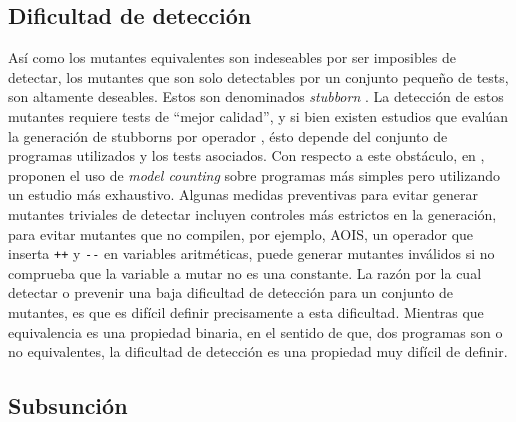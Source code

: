 \subsection{Dificultad de detecci\'on}

As\'i como los mutantes equivalentes son indeseables por ser imposibles de detectar, los mutantes que son solo detectables por un conjunto peque\~no de tests, son altamente deseables. Estos son denominados \emph{stubborn} \cite{bibliography.mutation.evaluation.stubbornHieronsHD99}. La detecci\'on de estos mutantes requiere tests de ``mejor calidad'', y si bien existen estudios que eval\'uan la generaci\'on de stubborns por operador \cite{bibliography.mutation.evaluation.stubborn}, \'esto depende del conjunto de programas utilizados y los tests asociados. Con respecto a este obst\'aculo, en \cite{bibliography.mutation.evaluation.hardnessVisser}, proponen el uso de \emph{model counting} sobre programas m\'as simples pero utilizando un estudio m\'as exhaustivo. Algunas medidas preventivas para evitar generar mutantes triviales de detectar incluyen controles m\'as estrictos en la generaci\'on, para evitar mutantes que no compilen, por ejemplo, AOIS, un operador que inserta \lstinline|++| y \lstinline|--| en variables aritm\'eticas, puede generar mutantes inv\'alidos si no comprueba que la variable a mutar no es una constante. La raz\'on por la cual detectar o prevenir una baja dificultad de detecci\'on para un conjunto de mutantes, es que es dif\'icil definir precisamente a esta dificultad. Mientras que equivalencia es una propiedad binaria, en el sentido de que, dos programas son o no equivalentes, la dificultad de detecci\'on es una propiedad muy dif\'icil de definir. 

\subsection{Subsunci\'on}

